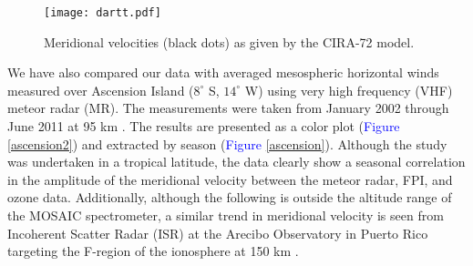 \documentclass[11pt]{article}
\begin{document}
	\begin{figure}[t]
		\centering
		\texttt{[image: dartt.pdf]}
		\caption{Meridional velocities (black dots) as given by the CIRA-72 model.}
		\label{dartt}
	\end{figure}		

We have also compared our data with averaged mesospheric horizontal winds measured over Ascension Island ($8^\circ$ S, $14^\circ$ W) using very high frequency (VHF) meteor radar (MR). The measurements were taken from January 2002 through June 2011 at 95 km \cite{Davis2013}. The results are presented as a color plot (\textcolor{blue}{Figure} \ref{ascension2}) and extracted by season (\textcolor{blue}{Figure} \ref{ascension}). Although the study was undertaken in a tropical latitude, the data clearly show a seasonal correlation in the amplitude of the meridional velocity between the meteor radar, FPI, and ozone data. Additionally, although the following is outside the altitude range of the MOSAIC spectrometer, a similar trend in meridional velocity is seen from Incoherent Scatter Radar (ISR) at the Arecibo Observatory in Puerto Rico targeting the F-region of the ionosphere at 150 km \cite{Kohen2007}.
\end{document}
